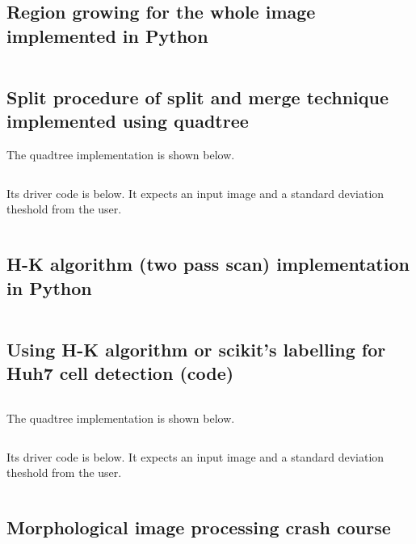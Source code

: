 \documentclass[a4paper]{article}
\begin{document}
\subsection{Region growing for the whole image implemented in Python}
\label{app:region_growing_src}

\inputminted{python}{src/region_grow/region_grow.py}


\newpage
\subsection{Split procedure of split and merge technique implemented using quadtree}
\label{app:app_quadtree}

The quadtree implementation is shown below.
\inputminted{python}{src/split_merge/qtree.py}
Its driver code is below. It expects an input image and a standard deviation theshold from the user.
\inputminted{python}{src/split_merge/qtree_main.py}

\newpage
\subsection{H-K algorithm (two pass scan) implementation in Python}
\label{app:hk_algo_source}

\inputminted{python}{src/cc/scan_union.py}

\newpage
\subsection{Using H-K algorithm or scikit's labelling for Huh7 cell detection (code)}
\label{app:cc_huh7}
\inputminted{python}{src/conn_comp_huh7/huh7_cc_progth.py}


The quadtree implementation is shown below.
\inputminted{python}{src/split_merge/qtree.py}
Its driver code is below. It expects an input image and a standard deviation theshold from the user.
\inputminted{python}{src/split_merge/qtree_main.py}


\newpage
\subsection{Morphological image processing crash course}
\label{app:morphology}
\end{document}
